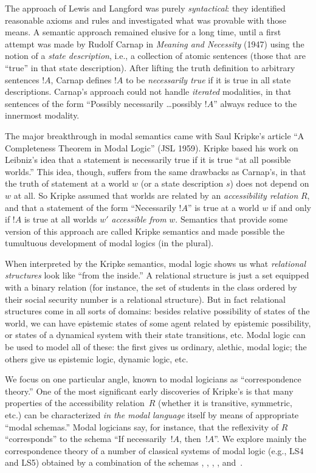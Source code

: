 \documentclass[10pt,a4paper]{article}
\theoremstyle{plain}
\theoremstyle{definition}
\theoremstyle{remark}
\providecommand{\Log}{\ensuremath{\mathrm{L}}}
\providecommand{\Ax}{\mathrm{Ax}}
\begin{document}
The approach of Lewis and Langford was purely \emph{syntactical}: they
identified reasonable axioms and rules and investigated what was
provable with those means. A semantic approach remained elusive for a
long time, until a first attempt was made by Rudolf Carnap in
\emph{Meaning and Necessity} (1947) using the notion of a \emph{state
  description}, i.e., a collection of atomic sentences (those that are
``true'' in that state description). After lifting the truth
definition to arbitrary sentences $!A$, Carnap defines $!A$
to be \emph{necessarily true} if it is true in all state
descriptions. Carnap's approach could not handle \emph{iterated}
modalities, in that sentences of the form ``Possibly necessarily
\ldots possibly $!A$'' always reduce to the innermost modality.

The major breakthrough in modal semantics came with Saul Kripke's
article ``A Completeness Theorem in Modal Logic'' (JSL 1959). Kripke
based his work on Leibniz's idea that a statement is necessarily true
if it is true ``at all possible worlds.'' This idea, though, suffers
from the same drawbacks as Carnap's, in that the truth of statement at
a world $w$ (or a state description $s$) does not depend on $w$ at
all. So Kripke assumed that worlds are related by an
\emph{accessibility relation} $R$, and that a statement of the form
``Necessarily $!A$'' is true at a world $w$ if and only if
$!A$ is true at all worlds $w'$ \emph{accessible from}
$w$. Semantics that provide some version of this approach are called
Kripke semantics and made possible the tumultuous development of modal
logics (in the plural).

When interpreted by the Kripke semantics, modal logic shows us what
\emph{relational structures} look like ``from the inside.'' A
relational structure is just a set equipped with a binary relation
(for instance, the set of students in the class ordered by their
social security number is a relational structure). But in fact
relational structures come in all sorts of domains: besides relative
possibility of states of the world, we can have epistemic states of
some agent related by epistemic possibility, or states of a dynamical
system with their state transitions, etc. Modal logic can be used to
model all of these: the first gives us ordinary, alethic, modal logic;
the others give us epistemic logic, dynamic logic, etc.

We focus on one particular angle, known to modal logicians as
``correspondence theory.'' One of the most significant early
discoveries of Kripke's is that many properties of the accessibility
relation~$R$ (whether it is transitive, symmetric, etc.)  can be
characterized \emph{in the modal language} itself by means of
appropriate ``modal schemas.'' Modal logicians say, for instance, that
the reflexivity of $R$ ``corresponds'' to the schema ``If
necessarily~$!A$, then~$!A$''. We explore mainly the correspondence
theory of a number of classical systems of modal logic (e.g., \Log{S4}
and \Log{S5}) obtained by a combination of the schemas \Ax{D}, \Ax{T},
\Ax{B}, \Ax{4}, and~\Ax{5}.
\end{document}
